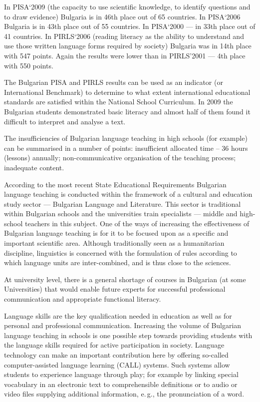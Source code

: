 \documentclass[]{../../metanetpaper}
\begin{document}
\begin{multicols}{2}
In PISA‘2009 \cite{oecd} (the capacity to use scientific knowledge, to identify questions and to draw evidence) Bulgaria is in 46th place out of 65 countries. In PISA‘2006 Bulgaria is in 43th place out of 55 countries. In PISA‘2000 — in 33th place out of 41 countries. 
In PIRLS‘2006 \cite{nces} (reading literacy as the ability to understand and use those written language forms required by society) Bulgaria was in 14th place with 547 points. Again the results were lower than in PIRLS’2001 — 4th place with 550 points.

The Bulgarian PISA and PIRLS results can be used as an indicator (or International Benchmark) to determine to what extent international educational standards are satisfied within the National School Curriculum. In 2009 the Bulgarian students demonstrated basic literacy and almost half of them found it difficult to interpret and analyse a text. 

The insufficiencies of Bulgarian language teaching in high schools (for example) can be summarised in a number of points: insufficient allocated time – 36 hours (lessons) annually; non-communicative organisation of the teaching process; inadequate content.

According to the most recent State Educational Requirements Bulgarian language teaching is conducted within the framework of a cultural and education study sector — Bulgarian Language and Literature. This sector is traditional within Bulgarian schools and the universities train specialists — middle and high-school teachers in this subject. One of the ways of increasing the effectiveness of Bulgarian language teaching is for it to be focused upon as a specific and important scientific area. Although traditionally seen as a humanitarian discipline, linguistics is concerned with the formulation of rules according to which language units are inter-combined, and is thus close to the sciences. 

At university level, there is a general shortage of courses in Bulgarian (at some Universities) that would enable future experts for successful professional communication and appropriate functional literacy.


Language skills are the key qualification needed in education as well as for personal and professional communication. Increasing the volume of Bulgarian language teaching in schools is one possible step towards providing students with the language skills required for active participation in society. Language technology can make an important contribution here by offering so-called computer-assisted language learning (CALL) systems. Such systems allow students to experience language through play; for example by linking special vocabulary in an electronic text to comprehensible definitions or to audio or video files supplying additional information, e.\,g., the pronunciation of a word. 


\end{multicols}
\end{document}
